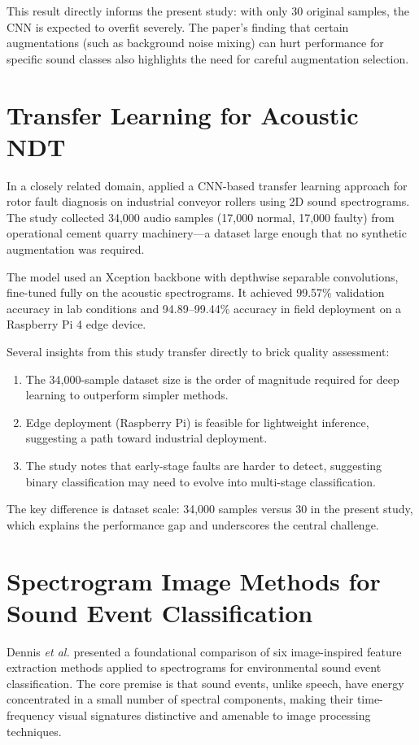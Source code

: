 \documentclass[12pt,a4paper,oneside]{report}
\begin{document}
This result directly informs the present study: with only 30 original samples, the CNN is expected to overfit severely. The paper's finding that certain augmentations (such as background noise mixing) can hurt performance for specific sound classes also highlights the need for careful augmentation selection.

\section{Transfer Learning for Acoustic NDT}

In a closely related domain, \cite{rotor2023} applied a CNN-based transfer learning approach for rotor fault diagnosis on industrial conveyor rollers using 2D sound spectrograms. The study collected 34,000 audio samples (17,000 normal, 17,000 faulty) from operational cement quarry machinery---a dataset large enough that no synthetic augmentation was required.

The model used an Xception backbone with depthwise separable convolutions, fine-tuned fully on the acoustic spectrograms. It achieved 99.57\% validation accuracy in lab conditions and 94.89--99.44\% accuracy in field deployment on a Raspberry Pi 4 edge device.

Several insights from this study transfer directly to brick quality assessment:
\begin{enumerate}
    \item The 34,000-sample dataset size is the order of magnitude required for deep learning to outperform simpler methods.
    \item Edge deployment (Raspberry Pi) is feasible for lightweight inference, suggesting a path toward industrial deployment.
    \item The study notes that early-stage faults are harder to detect, suggesting binary classification may need to evolve into multi-stage classification.
\end{enumerate}

The key difference is dataset scale: 34,000 samples versus 30 in the present study, which explains the performance gap and underscores the central challenge.

\section{Spectrogram Image Methods for Sound Event Classification}

Dennis \textit{et al.} \cite{dennis2014} presented a foundational comparison of six image-inspired feature extraction methods applied to spectrograms for environmental sound event classification. The core premise is that sound events, unlike speech, have energy concentrated in a small number of spectral components, making their time-frequency visual signatures distinctive and amenable to image processing techniques.
\end{document}
